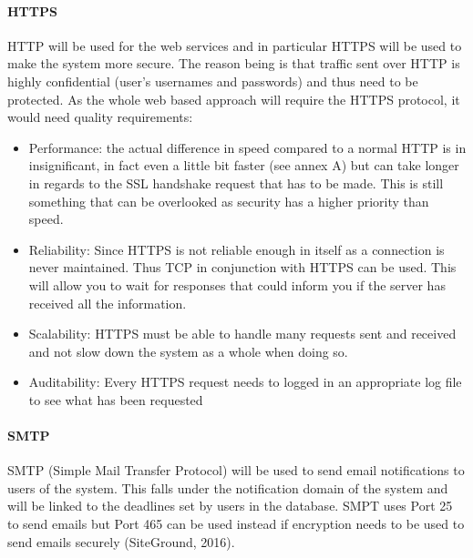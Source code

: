 \documentclass{article}
\begin{document}
    		\paragraph{HTTPS}
    			HTTP will be used for the web services and in particular HTTPS will be used to make the system more secure. The reason being is that traffic sent over HTTP is highly confidential (user’s usernames and passwords) and thus need to be protected. As the whole web based approach will require the HTTPS protocol, it would need quality requirements:
     \begin{itemize}
        \item Performance: the actual difference in speed compared to a normal HTTP is in insignificant, in fact even a little bit   faster (see annex A) but can take longer in regards to the SSL handshake request that has to be made. This is still something that can be overlooked as security has a higher priority than speed.
        \item Reliability: Since HTTPS is not reliable enough in itself as a connection is never maintained. Thus TCP in conjunction with HTTPS can be used. This will allow you to wait for responses that could inform you if the server has received all the information. 
        \item Scalability: HTTPS must be able to handle many requests sent and received and not slow down the system as a whole when doing so.
        \item Auditability: Every HTTPS request needs to  logged in an appropriate log file to see what has been requested
        \end{itemize}
        	
        	\paragraph{SMTP}
				SMTP (Simple Mail Transfer Protocol) will be used to send email notifications to users of the system. This falls under the notification domain of the system and will be linked to the deadlines set by users in the database. SMPT uses Port 25 to send emails but Port 465 can be used instead if encryption needs to be used to send emails securely (SiteGround, 2016). 
				
\end{document}
